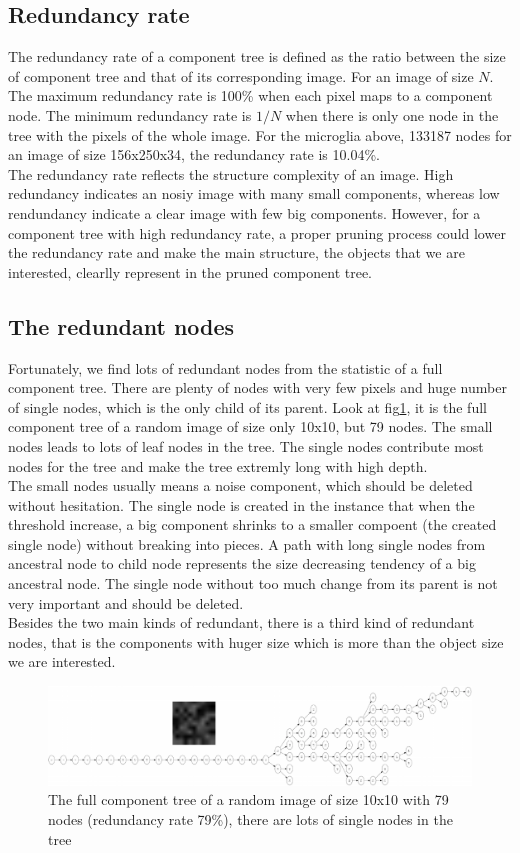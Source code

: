 \subsection{Redundancy rate}
The redundancy rate of a component tree is defined as the ratio between the size of component tree and that of its corresponding image. For an image of size $N$. The maximum redundancy rate is 100\% when each pixel maps to a component node. The minimum redundancy rate is $1/N$ when there is only one node in the tree with the pixels of the whole image. For the microglia above, 133187 nodes for an image of size 156x250x34, the redundancy rate is 10.04\%.\\
The redundancy rate reflects the structure complexity of an image. High redundancy indicates an nosiy image with many small components, whereas low rendundancy indicate a clear image with few big components. However, for a component tree with high redundancy rate, a proper pruning process could lower the redundancy rate and make the main structure, the objects that we are interested, clearlly represent in the pruned component tree.
\subsection{The redundant nodes}
Fortunately, we find lots of redundant nodes from the statistic of a full component tree. There are plenty of nodes with very few pixels and huge number of single nodes, which is the only child of its parent. Look at fig\ref{fig:cptree-random}, it is the full component tree of a random image of size only 10x10, but 79 nodes. The small nodes leads to lots of leaf nodes in the tree. The single nodes contribute most nodes for the tree and make the tree extremly long with high depth. \\
The small nodes usually means a noise component, which should be deleted without hesitation. The single node is created in the instance that when the threshold increase, a big component shrinks to a smaller compoent (the created single node) without breaking into pieces. A path with long single nodes from ancestral node to child node represents the size decreasing tendency of a big ancestral node. The single node without too much change from its parent is not very important and should be deleted.\\
Besides the two main kinds of redundant, there is a third kind of redundant nodes, that is the components with huger size which is more than the object size we are interested. 
\begin{figure}[htbp]
\centering
\includegraphics[width=1.0\textwidth]{images/cptree_random}
\caption[The full component tree of a random image]{The full component tree of a random image of size 10x10 with 79 nodes (redundancy rate 79\%), there are lots of single nodes in the tree}
\label{fig:cptree-random}
\end{figure}

